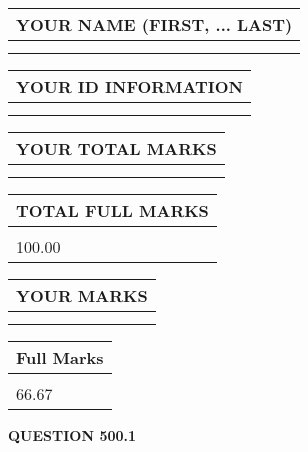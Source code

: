 \documentclass{ctexart}
\begin{document}
   
   
   
\newpage 
\setcounter{page}{ 
   500001 } 
   
   
   
   
\noindent\begin{tabular}{|l|}
\hline
YOUR NAME (FIRST, ... LAST)  \\
\hline
 \\ 
 \\ 
\hline
\end{tabular}
\hspace{0.05in} \begin{tabular}{|l|}
\hline
 YOUR   ID   INFORMATION  \\
\hline
 \\ 
 \\ 
\hline
\end{tabular}
   
   
\vspace{0.2in}\noindent\begin{tabular}{|l|}
\hline
YOUR TOTAL MARKS  \\
\hline
 \\ 
 \\ 
\hline
\end{tabular}
\hspace{0.05in} \begin{tabular}{|l|}
\hline
TOTAL FULL MARKS  \\
\hline
 \\ 
100.00 \\
\hline
\end{tabular}
   
   
 \vspace{0.2in}
 
 
 
 
   
   
  
\vspace{0.2in}
  
\noindent\begin{tabular}{|l|}
\hline
 YOUR MARKS  \\
\hline
 \\ 
 \\ 
\hline
\end{tabular}
\hspace{0.05in} \begin{tabular}{|l|}
\hline
 Full Marks  \\
\hline
 \\ 
66.67 \\
\hline
\end{tabular}
{\textbf{\Large{QUESTION
500.1 
}}}
  
\end{document}
